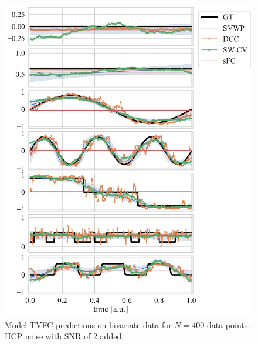 \begin{figure}[h]
  \centering
  \includegraphics[width=\textwidth]{fig/sim/d2/N0400_T0200/HCP_noise_snr_2/all_covs_types_correlations}
  \caption{
    Model TVFC predictions on bivariate data for $N = 400$ data points.
    HCP noise with SNR of 2 added.
  }\label{fig:results-all-covariance-structures-tvfc-predictions-snr-2}
\end{figure}


